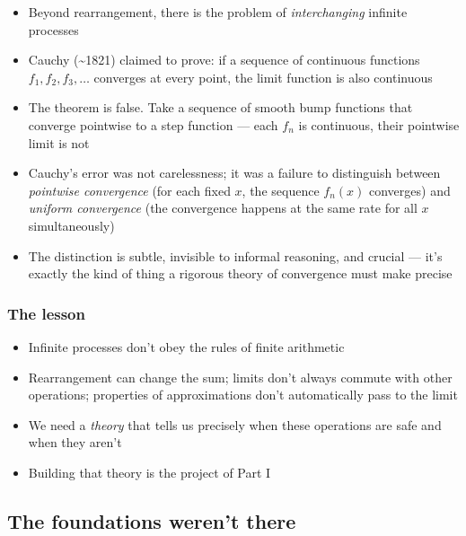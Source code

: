 \documentclass[
  10pt,
  letterpaper,
]{scrbook}
\providecommand{\tightlist}{%
  \setlength{\itemsep}{0pt}\setlength{\parskip}{0pt}}
\begin{document}
\begin{itemize}
\tightlist
\item
  Beyond rearrangement, there is the problem of \emph{interchanging}
  infinite processes
\item
  Cauchy (\textasciitilde1821) claimed to prove: if a sequence of
  continuous functions \(f_1, f_2, f_3, \ldots\) converges at every
  point, the limit function is also continuous
\item
  The theorem is false. Take a sequence of smooth bump functions that
  converge pointwise to a step function --- each \(f_n\) is continuous,
  their pointwise limit is not
\item
  Cauchy's error was not carelessness; it was a failure to distinguish
  between \emph{pointwise convergence} (for each fixed \(x\), the
  sequence \(f_n(x)\) converges) and \emph{uniform convergence} (the
  convergence happens at the same rate for all \(x\) simultaneously)
\item
  The distinction is subtle, invisible to informal reasoning, and
  crucial --- it's exactly the kind of thing a rigorous theory of
  convergence must make precise
\end{itemize}

\subsubsection*{The lesson}\label{the-lesson}

\begin{itemize}
\tightlist
\item
  Infinite processes don't obey the rules of finite arithmetic
\item
  Rearrangement can change the sum; limits don't always commute with
  other operations; properties of approximations don't automatically
  pass to the limit
\item
  We need a \emph{theory} that tells us precisely when these operations
  are safe and when they aren't
\item
  Building that theory is the project of Part I
\end{itemize}

\subsection*{The foundations weren't
there}\label{the-foundations-werent-there}
\end{document}
